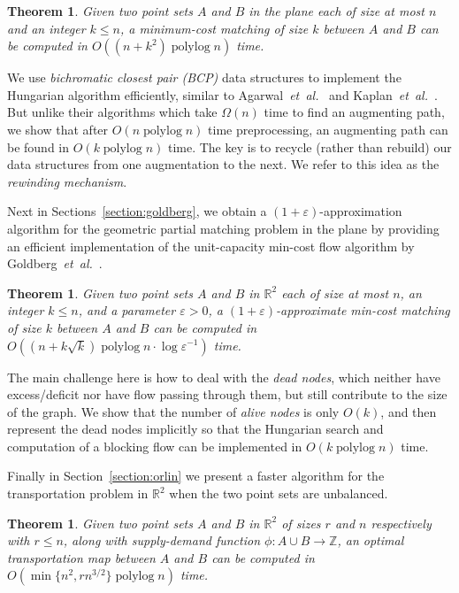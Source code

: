 \documentclass[11pt]{article}
\def\etal{\emph{et~al.}}
\def\etal{\textit{et~al.}}
\def\polylog{\mathop{\mathrm{polylog}}}
\def\eps{\varepsilon}
\def\reals{\mathbb{R}}
\def\ints{\mathbb{Z}}
\def\tsupply{\phi}
\newtheorem{theorem}[lemma]{Theorem}
\numberwithin{figure}{section}
\begin{document}
\begin{theorem}
\label{theorem:hung}
Given two point sets $A$ and $B$ in the plane each of size at most $n$ and an
integer $k \leq n$, a minimum-cost matching of size $k$ between $A$ and $B$ can
be computed in $O((n + k^2)\polylog n)$ time.
\end{theorem}

We use \emph{bichromatic closest pair (BCP)} data structures to implement the Hungarian algorithm efficiently, similar to Agarwal~\etal~\cite{AES99} and Kaplan~\etal~\cite{KMRSS17}.
But unlike their algorithms which take $\Omega(n)$ time to find an
augmenting path, we show that after $O(n\polylog n)$ time preprocessing,
an augmenting path can be found in $O(k\polylog n)$ time.
The key is to recycle (rather than rebuild) our data structures from one
augmentation to the next.
We refer to this idea as the \emph{rewinding mechanism}.

\medskip

Next in Sections~\ref{section:goldberg},
we obtain a $(1+\eps)$-approximation algorithm for the geometric partial
matching problem in the plane by providing an efficient implementation of the
unit-capacity min-cost flow algorithm by Goldberg~\etal~\cite{GHKT17}.

\begin{theorem}
\label{theorem:gmcm}
Given two point sets $A$ and $B$ in $\reals^2$ each of size at most $n$,
an integer $k \leq n$, and a parameter $\eps > 0$, a $(1+\eps)$-approximate
min-cost matching of size $k$ between $A$ and $B$ can be computed in
$O((n + k\sqrt{k})\polylog n \cdot \log\eps^{-1})$ time.
\end{theorem}

The main challenge here is how to deal with the \emph{dead nodes},
which neither have excess/deficit nor have flow passing through them,
but still contribute to the size of the graph.
We show that the number of \emph{alive nodes} is only $O(k)$, and then
represent the dead nodes implicitly so that the Hungarian search and
computation of a blocking flow can be implemented in $O(k\polylog n)$ time.

\medskip

Finally in Section~\ref{section:orlin} we present a faster algorithm for the
transportation problem in $\reals^2$ when the two point sets are unbalanced.

\begin{theorem}
\label{theorem:orlin}
Given two point sets $A$ and $B$ in $\reals^2$ of sizes $r$ and $n$ respectively
with $r \leq n$, along with supply-demand function $\tsupply:A \cup B \to \ints$,
an optimal transportation map between $A$ and $B$ can be computed in
$O(\min\{n^2, rn^{3/2}\}\polylog n)$ time.
\end{theorem}
\end{document}
